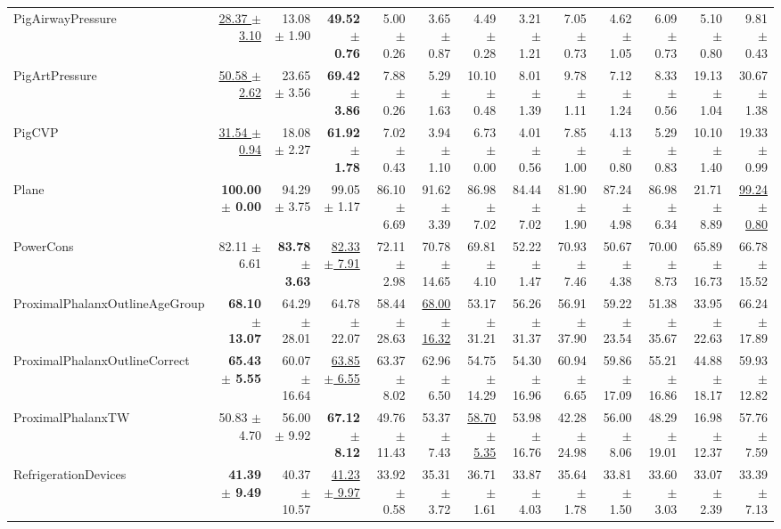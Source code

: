\begin{landscape}
\begin{longtable}{lrrrrrrrrrrrr}
PigAirwayPressure & \underline{28.37 $\pm$ 3.10} & 13.08 $\pm$ 1.90 & \textbf{49.52 $\pm$ 0.76} & 5.00 $\pm$ 0.26 & 3.65 $\pm$ 0.87 & 4.49 $\pm$ 0.28 & 3.21 $\pm$ 1.21 & 7.05 $\pm$ 0.73 & 4.62 $\pm$ 1.05 & 6.09 $\pm$ 0.73 & 5.10 $\pm$ 0.80 & 9.81 $\pm$ 0.43 \\
PigArtPressure & \underline{50.58 $\pm$ 2.62} & 23.65 $\pm$ 3.56 & \textbf{69.42 $\pm$ 3.86} & 7.88 $\pm$ 0.26 & 5.29 $\pm$ 1.63 & 10.10 $\pm$ 0.48 & 8.01 $\pm$ 1.39 & 9.78 $\pm$ 1.11 & 7.12 $\pm$ 1.24 & 8.33 $\pm$ 0.56 & 19.13 $\pm$ 1.04 & 30.67 $\pm$ 1.38 \\
PigCVP & \underline{31.54 $\pm$ 0.94} & 18.08 $\pm$ 2.27 & \textbf{61.92 $\pm$ 1.78} & 7.02 $\pm$ 0.43 & 3.94 $\pm$ 1.10 & 6.73 $\pm$ 0.00 & 4.01 $\pm$ 0.56 & 7.85 $\pm$ 1.00 & 4.13 $\pm$ 0.80 & 5.29 $\pm$ 0.83 & 10.10 $\pm$ 1.40 & 19.33 $\pm$ 0.99 \\
Plane & \textbf{100.00 $\pm$ 0.00} & 94.29 $\pm$ 3.75 & 99.05 $\pm$ 1.17 & 86.10 $\pm$ 6.69 & 91.62 $\pm$ 3.39 & 86.98 $\pm$ 7.02 & 84.44 $\pm$ 7.02 & 81.90 $\pm$ 1.90 & 87.24 $\pm$ 4.98 & 86.98 $\pm$ 6.34 & 21.71 $\pm$ 8.89 & \underline{99.24 $\pm$ 0.80} \\
PowerCons & 82.11 $\pm$ 6.61 & \textbf{83.78 $\pm$ 3.63} & \underline{82.33 $\pm$ 7.91} & 72.11 $\pm$ 2.98 & 70.78 $\pm$ 14.65 & 69.81 $\pm$ 4.10 & 52.22 $\pm$ 1.47 & 70.93 $\pm$ 7.46 & 50.67 $\pm$ 4.38 & 70.00 $\pm$ 8.73 & 65.89 $\pm$ 16.73 & 66.78 $\pm$ 15.52 \\
ProximalPhalanxOutlineAgeGroup & \textbf{68.10 $\pm$ 13.07} & 64.29 $\pm$ 28.01 & 64.78 $\pm$ 22.07 & 58.44 $\pm$ 28.63 & \underline{68.00 $\pm$ 16.32} & 53.17 $\pm$ 31.21 & 56.26 $\pm$ 31.37 & 56.91 $\pm$ 37.90 & 59.22 $\pm$ 23.54 & 51.38 $\pm$ 35.67 & 33.95 $\pm$ 22.63 & 66.24 $\pm$ 17.89 \\
ProximalPhalanxOutlineCorrect & \textbf{65.43 $\pm$ 5.55} & 60.07 $\pm$ 16.64 & \underline{63.85 $\pm$ 6.55} & 63.37 $\pm$ 8.02 & 62.96 $\pm$ 6.50 & 54.75 $\pm$ 14.29 & 54.30 $\pm$ 16.96 & 60.94 $\pm$ 6.65 & 59.86 $\pm$ 17.09 & 55.21 $\pm$ 16.86 & 44.88 $\pm$ 18.17 & 59.93 $\pm$ 12.82 \\
ProximalPhalanxTW & 50.83 $\pm$ 4.70 & 56.00 $\pm$ 9.92 & \textbf{67.12 $\pm$ 8.12} & 49.76 $\pm$ 11.43 & 53.37 $\pm$ 7.43 & \underline{58.70 $\pm$ 5.35} & 53.98 $\pm$ 16.76 & 42.28 $\pm$ 24.98 & 56.00 $\pm$ 8.06 & 48.29 $\pm$ 19.01 & 16.98 $\pm$ 12.37 & 57.76 $\pm$ 7.59 \\
RefrigerationDevices & \textbf{41.39 $\pm$ 9.49} & 40.37 $\pm$ 10.57 & \underline{41.23 $\pm$ 9.97} & 33.92 $\pm$ 0.58 & 35.31 $\pm$ 3.72 & 36.71 $\pm$ 1.61 & 33.87 $\pm$ 4.03 & 35.64 $\pm$ 1.78 & 33.81 $\pm$ 1.50 & 33.60 $\pm$ 3.03 & 33.07 $\pm$ 2.39 & 33.39 $\pm$ 7.13 \\

\end{longtable}
\end{landscape}
